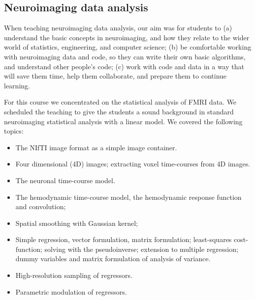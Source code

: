 
\subsection{Neuroimaging data analysis}\label{analysis}

When teaching neuroimaging data analysis, our aim was for students to
(a) understand the basic concepts in neuroimaging,
and how they relate to the wider world of statistics, engineering, and computer science;
(b) be comfortable working with neuroimaging data and code, so they can write
their own basic algorithms, and understand other people's code;
(c) work with code and data in a way that will save them time, help them collaborate,
and prepare them to continue learning.

For this course we concentrated on the statistical analysis of FMRI
data.  We scheduled the teaching to give the students a sound background in
standard neuroimaging statistical analysis with a linear model.  We covered
the following topics:

\begin{itemize}

\item The NIfTI image format as a simple image container.
\item Four dimensional (4D) images; extracting voxel time-courses from 4D
    images.
\item The neuronal time-course model.
\item The hemodynamic time-course model, the hemodynamic response function and
    convolution;
\item Spatial smoothing with Gaussian kernel;
\item Simple regression, vector formulation, matrix formulation; least-squares
    cost-function; solving with the pseudoinverse; extension to multiple
        regression; dummy variables and matrix formulation of analysis of
        variance.
\item High-resolution sampling of regressors.
\item Parametric modulation of regressors.


\end{itemize}

